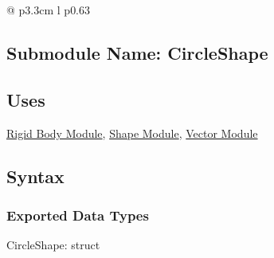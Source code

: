 \documentclass[12pt]{article}
\newcommand{\colDescrip}{0.63\textwidth}
\newcommand{\newfunc}{\\[1.5em]}
\newcommand{\Body}{\hyperref[MISBody]{Rigid Body Module}}
\newcommand{\Shape}{\hyperref[MISShape]{Shape Module}}
\newcommand{\Vector}{\hyperref[MISVector]{Vector Module}}
\begin{document}
\begin{longtable*}{@{} p{3.3cm} l p{\colDescrip}}
%		
	\end{longtable*}

\subsection{Submodule Name: CircleShape} \label{MISCircle}

\subsection{Uses} \label{SecUCircle}
	\Body, \Shape, \Vector

\subsection{Syntax}

\subsubsection{Exported Data Types} \label{SecEDTCircle}
	CircleShape: struct
\end{document}
